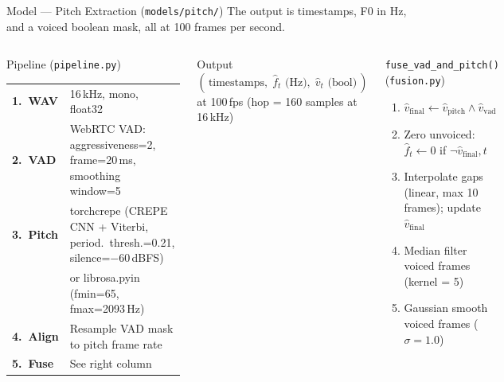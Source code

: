 \documentclass[aspectratio=169,9pt]{beamer}
\newcommand{\fh}{\hat{f}}
\newcommand{\vh}{\hat{v}}
\begin{document}
\begin{frame}{Model --- Pitch Extraction (\texttt{models/pitch/})}
{    The output is timestamps, F0 in Hz, and a voiced boolean mask, all at 100
    frames per second.
  }
  \begin{columns}[T]
      \begin{block}{Pipeline (\texttt{pipeline.py})}
        \small
        \renewcommand{\arraystretch}{1.2}
        \begin{tabular}{@{}lp{5.6cm}@{}}
          \textbf{1.\ WAV}   & 16\,kHz, mono, float32 \\
          \textbf{2.\ VAD}   & WebRTC VAD: aggressiveness=2, frame=20\,ms,
                               smoothing window=5 \\
          \textbf{3.\ Pitch} & torchcrepe (CREPE CNN + Viterbi,
                               period.\ thresh.=0.21, silence=$-60$\,dBFS)\\
                             & or librosa.pyin (fmin=65, fmax=2093\,Hz) \\
          \textbf{4.\ Align} & Resample VAD mask to pitch frame rate \\
          \textbf{5.\ Fuse}  & See right column \\
        \end{tabular}
      \end{block}
      \vspace{4pt}
      \begin{exampleblock}{Output}
        \small $(\,\text{timestamps},\; \fh_t\text{ (Hz)},\; \vh_t\text{ (bool)}\,)$
        at 100\,fps \; (hop = 160 samples at 16\,kHz)
      \end{exampleblock}

      \begin{block}{\texttt{fuse\_vad\_and\_pitch()} (\texttt{fusion.py})}
        \small
        \begin{enumerate}\setlength\itemsep{3pt}
          \item $\vh_\text{final} \leftarrow \vh_\text{pitch} \wedge \vh_\text{vad}$
          \item Zero unvoiced:\; $\fh_t \leftarrow 0$ if $\neg\vh_\text{final},t$
          \item Interpolate gaps (linear, max 10 frames); update $\vh_\text{final}$
          \item Median filter voiced frames (kernel = 5)
          \item Gaussian smooth voiced frames ($\sigma = 1.0$)
        \end{enumerate}
      \end{block}
  \end{columns}
\end{frame}
\end{document}
